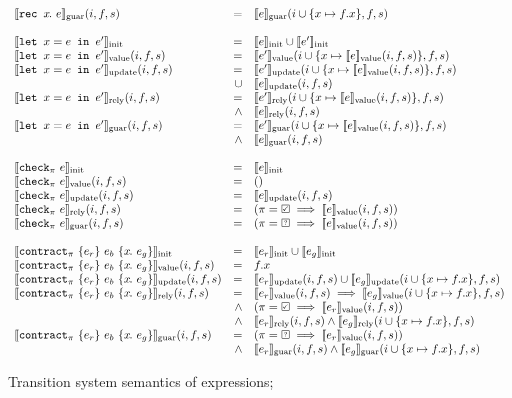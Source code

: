 \begin{figure}
\[\begin{array}{lrl}
    \sysguar{\xrec{x}{e}}(i, f, s) & = & \sysguar{e}(i \cup \{ x \mapsto f.x \}, f, s) \\
    \\
    \sysinit{\xlet{x}{e}{e'}} & = & \sysinit{e} \cup \sysinit{e'} \\
    \sysvalue{\xlet{x}{e}{e'}}(i, f, s) & = & \sysvalue{e'}(i \cup \{ x \mapsto \sysvalue{e}(i, f, s)\}, f, s) \\
    \sysupdate{\xlet{x}{e}{e'}}(i, f, s) & = & \sysupdate{e'}(i \cup \{ x \mapsto \sysvalue{e}(i, f, s)\}, f, s) \\
      & \cup & \sysupdate{e}(i, f, s) \\
    \sysrely{\xlet{x}{e}{e'}}(i, f, s) & = & \sysrely{e'}(i \cup \{ x \mapsto \sysvalue{e}(i, f, s)\}, f, s) \\
      & \wedge & \sysrely{e}(i, f, s) \\
    \sysguar{\xlet{x}{e}{e'}}(i, f, s) & = & \sysguar{e'}(i \cup \{ x \mapsto \sysvalue{e}(i, f, s)\}, f, s) \\
      & \wedge & \sysguar{e}(i, f, s) \\
    \\
    \sysinit{\xcheckP{\PStatus}{e}} & = & \sysinit{e} \\
    \sysvalue{\xcheckP{\PStatus}{e}}(i, f, s) & = & () \\
    \sysupdate{\xcheckP{\PStatus}{e}}(i, f, s) & = & \sysupdate{e}(i, f, s) \\
    \sysrely{\xcheckP{\PStatus}{e}}(i, f, s) & = & (\PStatus = \PSValid \implies \sysvalue{e}(i, f, s)) \\
    \sysguar{\xcheckP{\PStatus}{e}}(i, f, s) & = & (\PStatus = \PSUnknown \implies \sysvalue{e}(i, f, s)) \\
    \\
    \sysinit{\xctr} & = & \sysinit{e_r} \cup \sysinit{e_g} \\
    \sysvalue{\xctr}(i, f, s) & = & f.x \\
    \sysupdate{\xctr}(i, f, s) & = & \sysupdate{e_r}(i, f, s) \cup \sysupdate{e_g}(i \cup \{ x \mapsto f.x \}, f, s) \\
    \sysrely{\xctr}(i, f, s) & = & \sysvalue{e_r}(i, f, s) \implies \sysvalue{e_g}(i \cup \{ x \mapsto f.x \}, f, s) \\
                            & \wedge & (\PStatus = \PSValid \implies \sysvalue{e_r}(i, f, s)) \\
                            & \wedge & \sysrely{e_r}(i, f, s) \wedge \sysrely{e_g}(i \cup \{ x \mapsto f.x \}, f, s) \\
    \sysguar{\xctr}(i, f, s) & = & (\PStatus = \PSUnknown \implies \sysvalue{e_r}(i, f, s)) \\
    & \wedge & \sysguar{e_r}(i, f, s) \wedge \sysguar{e_g}(i \cup \{ x \mapsto f.x \}, f, s) \\
\end{array}
  \]
  \caption{Transition system semantics of expressions; }
  \label{f:system-translation}
\end{figure}